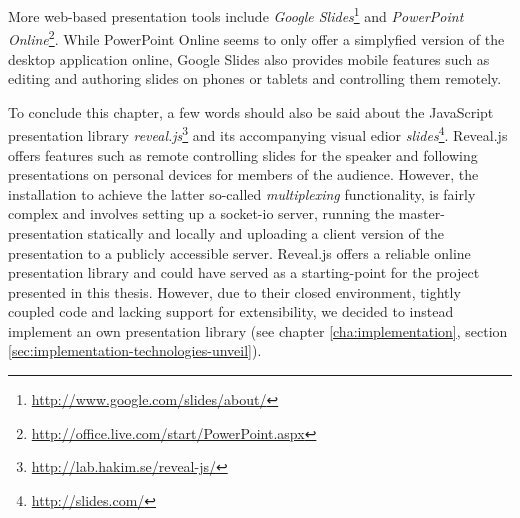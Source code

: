 More web-based presentation tools include \emph{Google Slides}\footnote{\url{http://www.google.com/slides/about/}} and \emph{PowerPoint Online}\footnote{\url{http://office.live.com/start/PowerPoint.aspx}}. While PowerPoint Online seems to only offer a simplyfied version of the desktop application online, Google Slides also provides mobile features such as editing and authoring slides on phones or tablets and controlling them remotely.

To conclude this chapter, a few words should also be said about the JavaScript presentation library \emph{reveal.js}\footnote{\url{http://lab.hakim.se/reveal-js/}} and its accompanying visual edior \emph{slides}\footnote{\url{http://slides.com/}}. Reveal.js offers features such as remote controlling slides for the speaker and following presentations on personal devices for members of the audience. However, the installation to achieve the latter so-called \emph{multiplexing} functionality, is fairly complex and involves setting up a socket-io server, running the master-presentation statically and locally and uploading a client version of the presentation to a publicly accessible server. Reveal.js offers a reliable online presentation library and could have served as a starting-point for the project presented in this thesis. However, due to their closed environment, tightly coupled code and lacking support for extensibility, we decided to instead implement an own presentation library (see chapter \ref{cha:implementation}, section \ref{sec:implementation-technologies-unveil}).